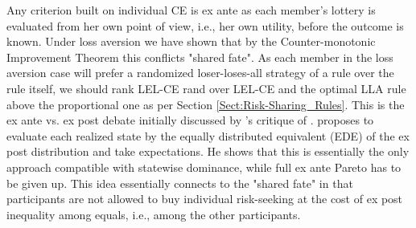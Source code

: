 Any criterion built on individual CE is ex ante as each member's lottery is evaluated from her own point of view, i.e., her own utility, before the outcome is known. Under loss aversion we have shown that by the Counter-monotonic Improvement Theorem \citep{Lauzier2024} this conflicts "shared fate". As each member in the loss aversion case will prefer a randomized loser-loses-all strategy of a rule over the rule itself, we should rank LEL-CE rand over LEL-CE and the optimal LLA rule above the proportional one as per Section \ref{Sect:Risk-Sharing_Rules}. This is the ex ante vs. ex post debate initially discussed by \citet{Diamond1967}'s critique of \citet{Harsanyi1955}. \citet{Fleurbaey2010} proposes to evaluate each realized state by the equally distributed equivalent (EDE) of the ex post distribution and take expectations. He shows that this is essentially the only approach compatible with statewise dominance, while full ex ante Pareto has to be given up. This idea essentially connects to the "shared fate" in that participants are not allowed to buy individual risk-seeking at the cost of ex post inequality among equals, i.e., among the other participants.


